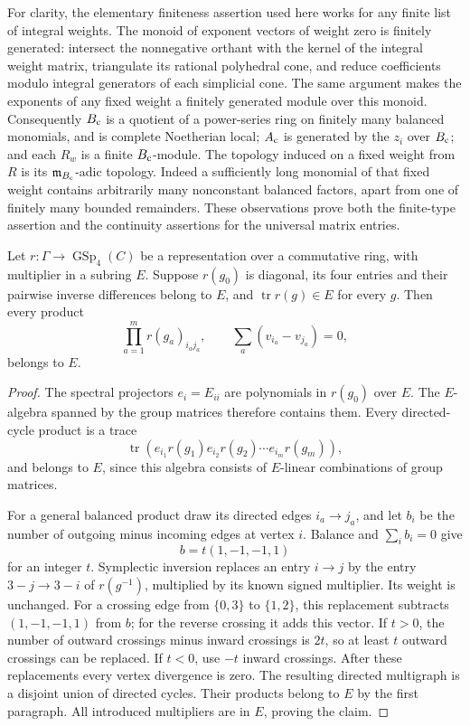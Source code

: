 For clarity, the elementary finiteness assertion used here
works for any finite list of integral weights.
The monoid of exponent vectors of weight zero is finitely
generated: intersect the nonnegative orthant with the kernel
of the integral weight matrix, triangulate its rational
polyhedral cone, and reduce coefficients modulo integral
generators of each simplicial cone.
The same argument makes the exponents of any fixed weight
a finitely generated module over this monoid.
Consequently \(B_{\rm c}\) is a quotient of a power-series
ring on finitely many balanced monomials, and is complete
Noetherian local; \(A_{\rm c}\) is generated by the \(z_i\)
over \(B_{\rm c}\); and each \(R_w\) is a finite
\(B_{\rm c}\)-module.
The topology induced on a fixed weight from \(R\) is its
\(\mathfrak m_{B_{\rm c}}\)-adic topology.
Indeed a sufficiently long monomial of that fixed weight
contains arbitrarily many nonconstant balanced factors,
apart from one of finitely many bounded remainders.
These observations prove both the finite-type assertion and
the continuity assertions for the universal matrix entries.

\begin{srlemma}
\label{lem:sr-four-balanced-traces}
Let \(r:\Gamma\to\operatorname{GSp}_4(C)\) be a representation
over a commutative ring, with multiplier in a subring \(E\).
Suppose \(r(g_0)\) is diagonal, its four entries and their
pairwise inverse differences belong to \(E\), and
\(\operatorname{tr}r(g)\in E\) for every \(g\).
Then every product
\[
                \prod_{a=1}^m r(g_a)_{i_a j_a},
       \qquad \sum_a(v_{i_a}-v_{j_a})=0 ,
\]
belongs to \(E\).
\end{srlemma}
\begin{proof}
The spectral projectors \(e_i=E_{ii}\) are polynomials in
\(r(g_0)\) over \(E\).
The \(E\)-algebra spanned by the group matrices therefore
contains them. Every directed-cycle product is a trace
\[
 \operatorname{tr}
   (e_{i_1}r(g_1)e_{i_2}r(g_2)\cdots e_{i_m}r(g_m)),
\]
and belongs to \(E\), since this algebra consists of
\(E\)-linear combinations of group matrices.

For a general balanced product draw its directed edges
\(i_a\to j_a\), and let \(b_i\) be the number of outgoing
minus incoming edges at vertex \(i\).
Balance and \(\sum_i b_i=0\) give
\[
                         b=t(1,-1,-1,1)
                                                        \tag{R4S2}
\]
for an integer \(t\).
Symplectic inversion replaces an entry \(i\to j\) by the
entry \(3-j\to3-i\) of \(r(g^{-1})\), multiplied by its
known signed multiplier. Its weight is unchanged.
For a crossing edge from \(\{0,3\}\) to \(\{1,2\}\),
this replacement subtracts \((1,-1,-1,1)\) from \(b\);
for the reverse crossing it adds this vector.
If \(t>0\), the number of outward crossings minus inward
crossings is \(2t\), so at least \(t\) outward crossings
can be replaced. If \(t<0\), use \(-t\) inward crossings.
After these replacements every vertex divergence is zero.
The resulting directed multigraph is a disjoint union
of directed cycles.
Their products belong to \(E\) by the first paragraph.
All introduced multipliers are in \(E\), proving the claim.
\end{proof}


